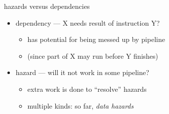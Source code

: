 
\begin{frame}{hazards versus dependencies}
    \begin{itemize}
        \item dependency --- X needs result of instruction Y?
            \begin{itemize}
                \item has potential for being messed up by pipeline
                \item (since part of X may run before Y finishes)
            \end{itemize}
        \item hazard --- will it not work in some pipeline?
            \begin{itemize}
                \item {} extra work is done to ``resolve'' hazards
                \item multiple kinds: so far, \textit{data hazards}
            \end{itemize}
    \end{itemize}
\end{frame}
